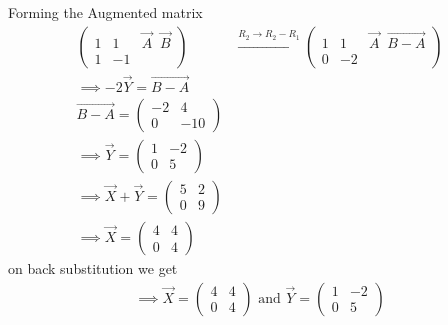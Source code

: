 \documentclass[journal]{IEEEtran}
\begin{document}
Forming the Augmented matrix
\begin{align}
\left(
\begin{array}{cc|c}
1 & 1 & \vec{A} \;\; \vec{B} \\
1 & -1 &
\end{array}
\right)  &\xrightarrow{R_2 \rightarrow R_2-R_1} \left(
\begin{array}{cc|c}
1 & 1 & \vec{A} \;\; \vec{B-A} \\
0 & -2 &
\end{array} \right)\\ 
\implies -2\Vec{Y}=\vec{B-A}\\
\vec{B-A}= \begin{pmatrix}
    -2 & 4\\
    0 & -10
\end{pmatrix}\\
\implies \Vec{Y}=\begin{pmatrix} 1 & -2 \\ 0 & 5 \end{pmatrix}\\
\implies \Vec{X}+\Vec{Y}=\begin{pmatrix} 5 & 2 \\ 0 & 9 \end{pmatrix}\\
\implies \Vec{X}=\begin{pmatrix} 4 & 4 \\ 0 & 4 \end{pmatrix}
\end{align}
on back substitution we get
\begin{align}
    \implies \Vec{X}=\begin{pmatrix} 4 & 4 \\ 0 & 4 \end{pmatrix} \text{ and }
    \Vec{Y}=\begin{pmatrix} 1 & -2 \\ 0 & 5 \end{pmatrix}
\end{align}
\end{document}
